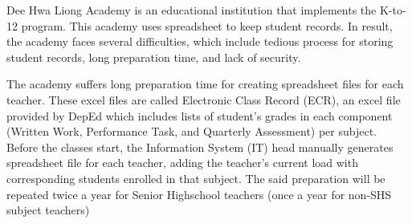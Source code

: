 \documentclass[11pt,a4paper,titlepage]{article}
\begin{document}




Dee Hwa Liong Academy is an educational institution that implements the K-to-12 program. This academy uses spreadsheet to keep student records. In result, the academy faces several difficulties, which include tedious process for storing student records, long preparation time, and lack of security.

The academy suffers long preparation time for creating spreadsheet files for each teacher. These excel files are called Electronic Class Record (ECR), an excel file provided by DepEd which includes lists of student's grades in each component (Written Work, Performance Task, and Quarterly Assessment) per subject. Before the classes start, the Information System (IT) head manually generates spreadsheet file for each teacher, adding the teacher's current load with corresponding students enrolled in that subject. The said preparation will be repeated twice a year for Senior Highschool teachers (once a year for non-SHS subject teachers)
\end{document}
